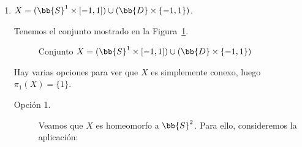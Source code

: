 \begin{ejercicio}
\begin{enumerate}[label=\alph*)]

        \item $X=(\bb{S}^1 \times [-1,1])\cup (\bb{D}\times \{-1,1\})$.

            Tenemos el conjunto mostrado en la Figura~\ref{fig:conjuntoX_B}.
            \begin{figure}[h]
                \centering
                \caption{Conjunto $X=(\bb{S}^1 \times [-1,1])\cup (\bb{D}\times \{-1,1\})$}
                \label{fig:conjuntoX_B}
            \end{figure}

            Hay varias opciones para ver que $X$ es simplemente conexo, luego $\pi_1(X)=\{1\}$.
            \begin{description}
                \item[Opción 1.] Veamos que $X$ es homeomorfo a $\bb{S}^2$. Para ello, consideremos la aplicación:


\end{description}
\end{enumerate}
\end{ejercicio}
